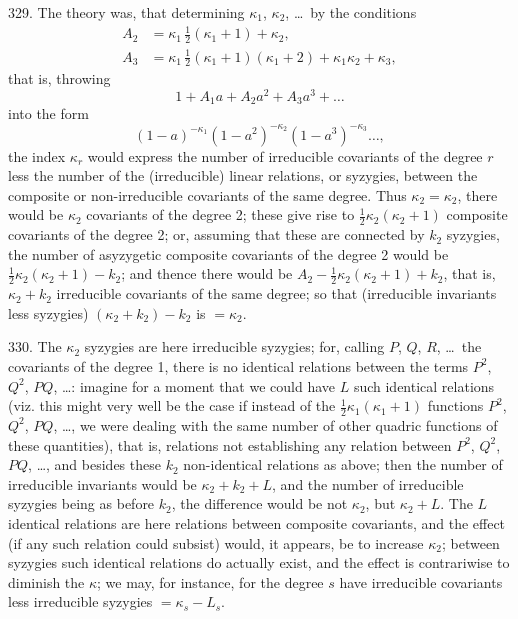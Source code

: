 \documentclass[11pt,a4paper]{article}
\begin{document}
329. The theory was, that determining $\kappa_{1}$, $\kappa_{2}$, \ldots\ by the conditions
\begin{align*}
A_{2} &= \kappa_{1}\, \tfrac{1}{2}(\kappa_{1}+1) + \kappa_{2},\\
A_{3} &= \kappa_{1}\, \tfrac{1}{2}(\kappa_{1}+1)(\kappa_{1}+2) + \kappa_{1}\kappa_{2} + \kappa_{3},
\end{align*}
that is, throwing
\[
1 + A_{1}a + A_{2}a^{2} + A_{3}a^{3} + \ldots
\]
into the form
\[
(1-a)^{-\kappa_{1}}(1-a^{2})^{-\kappa_{2}}(1-a^{3})^{-\kappa_{3}}\ldots,
\]
the index $\kappa_{r}$ would express the number of irreducible covariants of the degree $r$ less the number of the (irreducible) linear relations, or syzygies, between the composite or non-irreducible covariants of the same degree. Thus $\kappa_{2} = \kappa_{2}$, there would be $\kappa_{2}$ covariants of the degree 2; these give rise to $\frac{1}{2}\kappa_{2}(\kappa_{2}+1)$ composite covariants of the degree 2; or, assuming that these are connected by $k_{2}$ syzygies, the number of asyzygetic composite covariants of the degree 2 would be $\frac{1}{2}\kappa_{2}(\kappa_{2}+1) - k_{2}$; and thence there would be $A_{2} - \frac{1}{2}\kappa_{2}(\kappa_{2}+1) + k_{2}$, that is, $\kappa_{2} + k_{2}$ irreducible covariants of the same degree; so that (irreducible invariants less syzygies) $(\kappa_{2} + k_{2}) - k_{2}$ is $= \kappa_{2}$.

\newpage
\setcounter{page}{337}

330. The $\kappa_{2}$ syzygies are here irreducible syzygies; for, calling $P$, $Q$, $R$, \ldots\ the covariants of the degree 1, there is no identical relations between the terms $P^{2}$, $Q^{2}$, $PQ$, \ldots: imagine for a moment that we could have $L$ such identical relations (viz. this might very well be the case if instead of the $\frac{1}{2}\kappa_{1}(\kappa_{1}+1)$ functions $P^{2}$, $Q^{2}$, $PQ$, \ldots, we were dealing with the same number of other quadric functions of these quantities), that is, relations not establishing any relation between $P^{2}$, $Q^{2}$, $PQ$, \ldots, and besides these $k_{2}$ non-identical relations as above; then the number of irreducible invariants would be $\kappa_{2} + k_{2} + L$, and the number of irreducible syzygies being as before $k_{2}$, the difference would be not $\kappa_{2}$, but $\kappa_{2} + L$. The $L$ identical relations are here relations between composite covariants, and the effect (if any such relation could subsist) would, it appears, be to increase $\kappa_{2}$; between syzygies such identical relations do actually exist, and the effect is contrariwise to diminish the $\kappa$; we may, for instance, for the degree $s$ have irreducible covariants less irreducible syzygies $= \kappa_{s} - L_{s}$.
\end{document}
